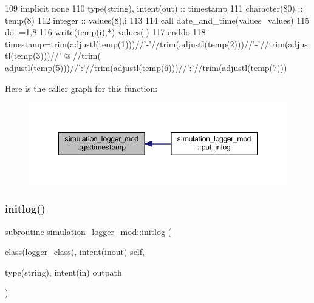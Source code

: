 \begin{DoxyCode}
109     \textcolor{keywordtype}{implicit none}
110     \textcolor{keywordtype}{type}(string), \textcolor{keywordtype}{intent(out)} :: timestamp
111     \textcolor{keywordtype}{character(80)} :: temp(8)
112     \textcolor{keywordtype}{integer} :: values(8),i
113 
114     \textcolor{keyword}{call }date\_and\_time(values=values)
115     \textcolor{keywordflow}{do} i=1,8
116         \textcolor{keyword}{write}(temp(i),*) values(i)
117 \textcolor{keywordflow}{    enddo}
118     timestamp=trim(adjustl(temp(1)))//\textcolor{stringliteral}{'-'}//trim(adjustl(temp(2)))//\textcolor{stringliteral}{'-'}//trim(adjustl(temp(3)))//\textcolor{stringliteral}{' @'}//trim(
      adjustl(temp(5)))//\textcolor{stringliteral}{':'}//trim(adjustl(temp(6)))//\textcolor{stringliteral}{':'}//trim(adjustl(temp(7)))
\end{DoxyCode}
Here is the caller graph for this function\+:
\nopagebreak
\begin{figure}[H]
\begin{center}
\leavevmode
\includegraphics[width=348pt]{namespacesimulation__logger__mod_a0326a5eeb649b041064a01d96aef0989_icgraph}
\end{center}
\end{figure}
\mbox{\label{namespacesimulation__logger__mod_abf603e657da9104a8060ab53c72f0aca}} 
\subsubsection{\texorpdfstring{initlog()}{initlog()}}
{\footnotesize\ttfamily subroutine simulation\+\_\+logger\+\_\+mod\+::initlog (\begin{DoxyParamCaption}\item[{class(\mbox{\hyperlink{structsimulation__logger__mod_1_1logger__class}{logger\+\_\+class}}), intent(inout)}]{self,  }\item[{type(string), intent(in)}]{outpath }\end{DoxyParamCaption})\hspace{0.3cm}{\ttfamily [private]}}



